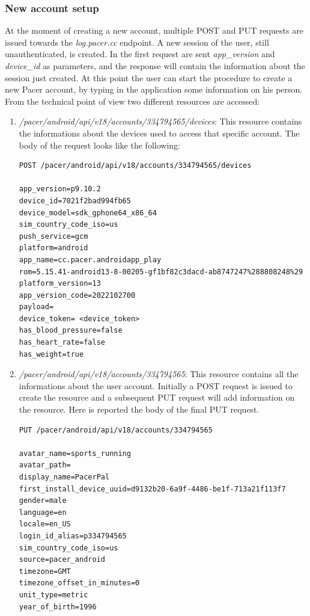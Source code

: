 		\subsubsection{New account setup}
			\par At the moment of creating a new account, multiple POST and PUT requests are issued towards the \textit{log.pacer.cc} endpoint. A new session of the user, still unauthenticated, is created. In the first request are sent \textit{app\_version} and \textit{device\_id} as parameters, and the response will contain the information about the session just created. At this point the user can start the procedure to create a new Pacer account, by typing in the application some information on his person. From the technical point of view two different resources are accessed:
			\begin{enumerate}
				\item \textit{/pacer/android/api/v18/accounts/334794565/devices}: This resource contains the informations about the devices used to access that specific account. The body of the request looks like the following:
\begin{lstlisting}
POST /pacer/android/api/v18/accounts/334794565/devices

app_version=p9.10.2
device_id=7021f2bad994fb65
device_model=sdk_gphone64_x86_64
sim_country_code_iso=us
push_service=gcm
platform=android
app_name=cc.pacer.androidapp_play
rom=5.15.41-android13-8-00205-gf1bf82c3dacd-ab8747247%288808248%29
platform_version=13
app_version_code=2022102700
payload=
device_token= <device_token>
has_blood_pressure=false
has_heart_rate=false
has_weight=true
\end{lstlisting}
				\item \textit{/pacer/android/api/v18/accounts/334794565}: This resource contains all the informations about the user account. Initially a POST request is issued to create the resource and a subsequent PUT request will add information on the resource. Here is reported the body of the final PUT request.
\begin{lstlisting}
PUT /pacer/android/api/v18/accounts/334794565

avatar_name=sports_running
avatar_path=
display_name=PacerPal
first_install_device_uuid=d9132b20-6a9f-4486-be1f-713a21f113f7
gender=male
language=en
locale=en_US
login_id_alias=p334794565
sim_country_code_iso=us
source=pacer_android
timezone=GMT
timezone_offset_in_minutes=0
unit_type=metric
year_of_birth=1996
\end{lstlisting}
			\end{enumerate} 
			
